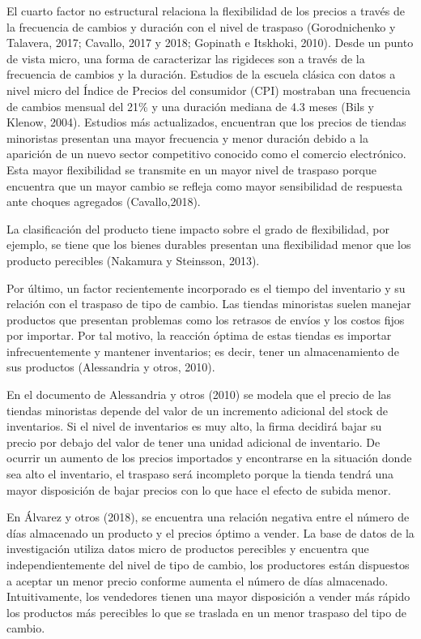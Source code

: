 \documentclass[12pt,a4paper,pdflatex]{article}
\begin{document}
El cuarto factor no estructural relaciona la flexibilidad de los precios a través de la frecuencia de cambios y duración con el nivel de traspaso (Gorodnichenko y Talavera, 2017; Cavallo, 2017 y 2018; Gopinath e Itskhoki, 2010). Desde un punto de vista micro, una forma de caracterizar las rigideces son a través de la frecuencia de cambios y la duración. Estudios de la escuela clásica con datos a nivel micro del Índice de Precios del consumidor (CPI) mostraban una frecuencia de cambios mensual del 21\% y una duración mediana de 4.3 meses (Bils y Klenow, 2004). Estudios más actualizados, encuentran que los precios de tiendas minoristas presentan una mayor frecuencia y menor duración debido a la aparición de un nuevo sector competitivo conocido como el comercio electrónico. Esta mayor flexibilidad se transmite en un mayor nivel de traspaso porque encuentra que un mayor cambio se refleja como mayor sensibilidad de respuesta ante choques agregados (Cavallo,2018).

La clasificación del producto tiene impacto sobre el grado de flexibilidad, por ejemplo, se tiene que los bienes durables presentan una flexibilidad menor que los producto perecibles (Nakamura y Steinsson, 2013).

Por último, un factor recientemente incorporado es el tiempo del inventario y su relación con el traspaso de tipo de cambio. Las tiendas minoristas suelen manejar productos que presentan problemas como los retrasos de envíos y los costos fijos por importar. Por tal motivo, la reacción óptima de estas tiendas es importar infrecuentemente y mantener inventarios; es decir, tener un almacenamiento de sus productos (Alessandria y otros, 2010).

En el documento de Alessandria y otros (2010) se modela que el precio de las tiendas minoristas depende del valor de un incremento adicional del stock de inventarios. Si el nivel de inventarios es muy alto, la firma decidirá bajar su precio por debajo del valor de tener una unidad adicional de inventario. De ocurrir un aumento de los precios importados y encontrarse en la situación donde sea alto el inventario, el traspaso será incompleto porque la tienda tendrá una mayor disposición de bajar precios con lo que hace el efecto de subida menor.

En Álvarez y otros (2018), se encuentra una relación negativa entre el número de días almacenado un producto y el precios óptimo a vender. La base de datos de la investigación utiliza datos micro de productos perecibles y encuentra que independientemente del nivel de tipo de cambio, los productores están dispuestos a aceptar un menor precio conforme aumenta el número de días almacenado. Intuitivamente, los vendedores tienen una mayor disposición a vender más rápido los productos más perecibles  lo que se traslada en un menor traspaso del tipo de cambio.
\end{document}
